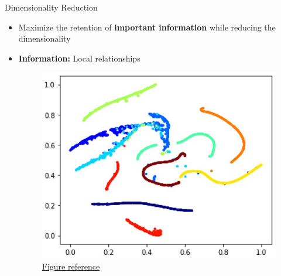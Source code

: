 \documentclass[serif, aspectratio=169]{beamer}
\begin{document}
\begin{frame}{Dimensionality Reduction}
    \begin{itemize}
        \item Maximize the retention of  \textbf{important information} while reducing the dimensionality
        \item \textbf{Information:} Local relationships
        \begin{figure}[htpb]
                \begin{center}
                    \includegraphics[keepaspectratio, scale=0.35]{pic/dim_red_local.JPG}
                  \caption{\href{https://datascience.stackexchange.com/questions/34146/what-does-the-long-curve-shape-t-sne-mean}{Figure reference}}
                \end{center}
        \end{figure}
    \end{itemize}
\end{frame}
\end{document}
